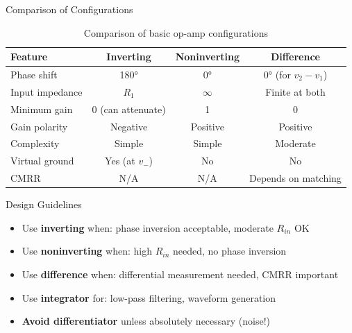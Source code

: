 \documentclass[10pt, aspectratio=169]{beamer}
\begin{document}
\begin{frame}{Comparison of Configurations}
    
    \begin{table}
    \centering
    \small
    \begin{tabular}{|l|c|c|c|}
    \hline
    \textbf{Feature} & \textbf{Inverting} & \textbf{Noninverting} & \textbf{Difference} \\
    \hline
    Phase shift & 180° & 0° & 0° (for $v_2-v_1$) \\
    \hline
    Input impedance & $R_1$ & $\infty$ & Finite at both \\
    \hline
    Minimum gain & 0 (can attenuate) & 1 & 0 \\
    \hline
    Gain polarity & Negative & Positive & Positive \\
    \hline
    Complexity & Simple & Simple & Moderate \\
    \hline
    Virtual ground & Yes (at $v_-$) & No & No \\
    \hline
    CMRR & N/A & N/A & Depends on matching \\
    \hline
    \end{tabular}
    \caption{Comparison of basic op-amp configurations}
    \end{table}
    
    \begin{block}{Design Guidelines}
        \begin{itemize}
            \item Use \textbf{inverting} when:  phase inversion acceptable, moderate $R_{in}$ OK
            \item Use \textbf{noninverting} when: high $R_{in}$ needed, no phase inversion
            \item Use \textbf{difference} when: differential measurement needed, CMRR important
            \item Use \textbf{integrator} for: low-pass filtering, waveform generation
            \item \textbf{Avoid differentiator} unless absolutely necessary (noise!)
        \end{itemize}
    \end{block}
    
\end{frame}
\end{document}
